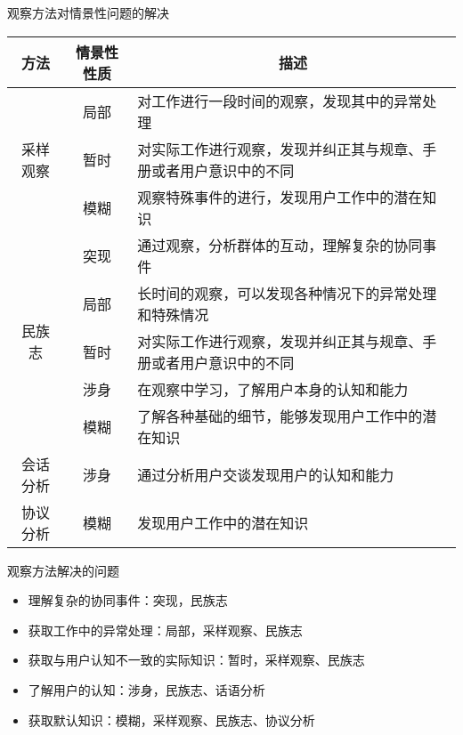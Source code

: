 观察方法对情景性问题的解决
\begin{table}[H]
    \centering
    \begin{tabular}{|c|c|l|}
    \hline
    方法                    & 情景性性质 & \multicolumn{1}{c|}{描述}          \\ \hline
    \multirow{3}{*}{采样观察} & 局部    & 对工作进行一段时间的观察，发现其中的异常处理           \\ \cline{2-3} 
                          & 暂时    & 对实际工作进行观察，发现并纠正其与规章、手册或者用户意识中的不同 \\ \cline{2-3} 
                          & 模糊    & 观察特殊事件的进行，发现用户工作中的潜在知识           \\ \hline
    \multirow{5}{*}{民族志}  & 突现    & 通过观察，分析群体的互动，理解复杂的协同事件           \\ \cline{2-3} 
                          & 局部    & 长时间的观察，可以发现各种情况下的异常处理和特殊情况       \\ \cline{2-3} 
                          & 暂时    & 对实际工作进行观察，发现并纠正其与规章、手册或者用户意识中的不同 \\ \cline{2-3} 
                          & 涉身    & 在观察中学习，了解用户本身的认知和能力              \\ \cline{2-3} 
                          & 模糊    & 了解各种基础的细节，能够发现用户工作中的潜在知识         \\ \hline
    会话分析                  & 涉身    & 通过分析用户交谈发现用户的认知和能力               \\ \hline
    协议分析                  & 模糊    & 发现用户工作中的潜在知识                     \\ \hline
    \end{tabular}
    \vspace{-1em}
\end{table}

观察方法解决的问题
\begin{itemize}
    \item 理解复杂的协同事件：突现，民族志 
    \item 获取工作中的异常处理：局部，采样观察、民族志
    \item 获取与用户认知不一致的实际知识：暂时，采样观察、民族志 
    \item 了解用户的认知：涉身，民族志、话语分析
    \item 获取默认知识：模糊，采样观察、民族志、协议分析
\end{itemize}


